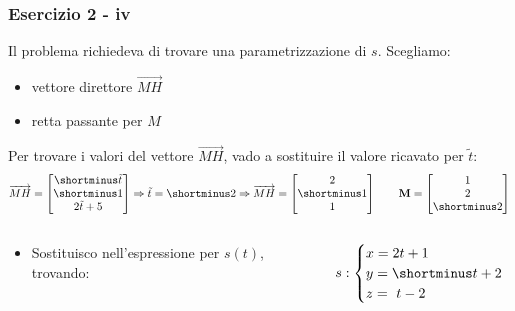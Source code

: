 \documentclass{beamer}
\begin{document}
\begin{frame}
\frametitle{Esercizio 2 - iv}
Il problema richiedeva di trovare una parametrizzazione di $s$. Scegliamo:
\begin{itemize}
        \item vettore direttore $\overrightarrow{MH}$
        \item retta passante per $M$
\end{itemize}

Per trovare i valori del vettore $\overrightarrow{MH}$, vado a sostituire il valore ricavato
per $\tilde t$:
$$
\overrightarrow{MH}
    =
    \begin{bmatrix}\shortminus \tilde t \\ \shortminus 1 \\ 2 \tilde t+5 \end{bmatrix}
\Rightarrow
\tilde t = \shortminus 2
\Rightarrow
\overrightarrow{MH}
    =
    \begin{bmatrix}2 \\ \shortminus 1 \\ 1\end{bmatrix}
        \qquad
    \mathbf M
    =
    \begin{bmatrix}1 \\ 2 \\ \shortminus 2 \end{bmatrix}
$$
\begin{columns}
\begin{column}{0.48\textwidth}
\begin{itemize}
\item Sostituisco nell'espressione per $s(t)$, trovando:
\end{itemize}
\end{column}
\begin{column}{0.48\textwidth}
\begin{displaymath}
s:
\begin{cases}
x  = 2t + 1 \\
y  = \shortminus t  + 2 \\
z  = \ t  - 2
\end{cases}
\end{displaymath}
\end{column}
\end{columns}
\end{frame}
%
\end{document}
